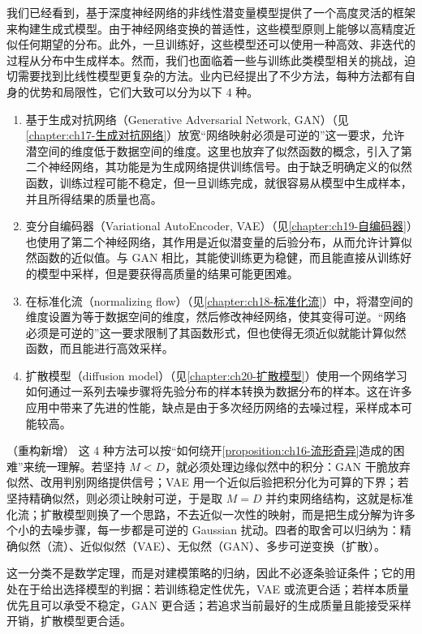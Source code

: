 \documentclass[../../main.tex]{subfiles}
\begin{document}
我们已经看到，基于深度神经网络的非线性潜变量模型提供了一个高度灵活的框架来构建生成式模型。由于神经网络变换的普适性，这些模型原则上能够以高精度近似任何期望的分布。此外，一旦训练好，这些模型还可以使用一种高效、非迭代的过程从分布中生成样本。然而，我们也面临着一些与训练此类模型相关的挑战，迫切需要找到比线性模型更复杂的方法。业内已经提出了不少方法，每种方法都有自身的优势和局限性，它们大致可以分为以下 4 种。
\begin{enumerate}
  \item 基于生成对抗网络（Generative Adversarial Network, GAN）（见\cref{chapter:ch17-生成对抗网络}）放宽“网络映射必须是可逆的”这一要求，允许潜空间的维度低于数据空间的维度。这里也放弃了似然函数的概念，引入了第二个神经网络，其功能是为生成网络提供训练信号。由于缺乏明确定义的似然函数，训练过程可能不稳定，但一旦训练完成，就很容易从模型中生成样本，并且所得结果的质量也高。
  \item 变分自编码器（Variational AutoEncoder, VAE）（见\cref{chapter:ch19-自编码器}）也使用了第二个神经网络，其作用是近似潜变量的后验分布，从而允许计算似然函数的近似值。与 GAN 相比，其能使训练更为稳健，而且能直接从训练好的模型中采样，但是要获得高质量的结果可能更困难。
  \item 在标准化流（normalizing flow）（见\cref{chapter:ch18-标准化流}）中，将潜空间的维度设置为等于数据空间的维度，然后修改神经网络，使其变得可逆。“网络必须是可逆的”这一要求限制了其函数形式，但也使得无须近似就能计算似然函数，而且能进行高效采样。
  \item 扩散模型（diffusion model）（见\cref{chapter:ch20-扩散模型}）使用一个网络学习如何通过一系列去噪步骤将先验分布的样本转换为数据分布的样本。这在许多应用中带来了先进的性能，缺点是由于多次经历网络的去噪过程，采样成本可能较高。
\end{enumerate}

\begin{remark}（重构新增）
这 4 种方法可以按“如何绕开\cref{proposition:ch16-流形奇异}造成的困难”来统一理解。若坚持 $M<D$，就必须处理边缘似然中的积分：GAN 干脆放弃似然、改用判别网络提供信号；VAE 用一个近似后验把积分化为可算的下界；若坚持精确似然，则必须让映射可逆，于是取 $M=D$ 并约束网络结构，这就是标准化流；扩散模型则换了一个思路，不去近似一次性的映射，而是把生成分解为许多个小的去噪步骤，每一步都是可逆的 Gaussian 扰动。四者的取舍可以归纳为：精确似然（流）、近似似然（VAE）、无似然（GAN）、多步可逆变换（扩散）。

这一分类不是数学定理，而是对建模策略的归纳，因此不必逐条验证条件；它的用处在于给出选择模型的判据：若训练稳定性优先，VAE 或流更合适；若样本质量优先且可以承受不稳定，GAN 更合适；若追求当前最好的生成质量且能接受采样开销，扩散模型更合适。
\end{remark}
\end{document}
